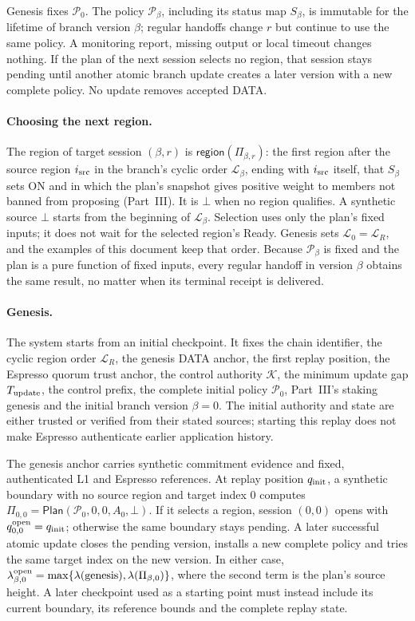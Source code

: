 \documentclass[11pt,a4paper]{article}
\newcommand{\tagg}[1]{\ensuremath{\mathsf{#1}}}
\begin{document}
Genesis fixes $\mathcal P_0$.  The policy $\mathcal P_\beta$, including its
status map $S_\beta$, is immutable for the lifetime of branch version
$\beta$; regular handoffs change $r$ but continue to use the same policy.
A monitoring report, missing output or local timeout changes nothing.  If
the plan of the next session selects no region, that session stays
pending until another atomic branch update creates a later version with a
new complete policy.  No update removes accepted DATA.

\paragraph{Choosing the next region.}
The region of target session $(\beta,r)$ is $\tagg{region}(\Pi_{\beta,r})$:
the first region after the source region $i_{\rm src}$ in the branch's
cyclic order $\mathcal L_\beta$, ending with $i_{\rm src}$ itself, that
$S_\beta$ sets ON and in which the plan's snapshot gives positive weight
to members not banned from proposing (Part~III). It is $\bot$ when no
region qualifies. A synthetic source $\bot$ starts from the beginning of
$\mathcal L_\beta$. Selection uses only the plan's fixed inputs; it does
not wait for the selected region's Ready. Genesis sets
$\mathcal L_0=\mathcal L_R$, and the examples of this document keep that
order. Because $\mathcal P_\beta$ is fixed and the plan is a pure
function of fixed inputs, every regular handoff in version $\beta$
obtains the same result, no matter when its terminal receipt is
delivered.

\paragraph{Genesis.}
The system starts from an initial checkpoint. It fixes the chain
identifier, the cyclic region order $\mathcal L_R$, the genesis DATA
anchor, the first replay position, the Espresso quorum trust anchor,
the control authority $\mathcal K$, the minimum update gap
$T_{\rm update}$, the control prefix, the complete initial policy
$\mathcal P_0$, Part~III's staking genesis and the initial branch version
$\beta=0$. The initial authority and state are either trusted or verified
from their stated sources; starting this replay does not make Espresso
authenticate earlier application history.

The genesis anchor carries synthetic commitment evidence and fixed,
authenticated L1 and Espresso references. At replay position
$q_{\rm init}$, a synthetic boundary with no source region and target
index 0 computes $\Pi_{0,0}=\tagg{Plan}(\mathcal P_0,0,0,A_0,\bot)$. If it
selects a region, session $(0,0)$ opens with
$q^{\rm open}_{0,0}=q_{\rm init}$; otherwise the same boundary stays
pending. A later successful atomic update closes the pending version,
installs a new complete policy and tries the same target index on the
new version. In either case,
$\lambda^{\rm open}_{\beta,0}=\max\{\lambda(\text{genesis}),
\lambda(\Pi_{\beta,0})\}$, where the second term is the plan's source
height. A later checkpoint used as a starting point must instead include
its current boundary, its reference bounds and the complete replay state.
\end{document}

